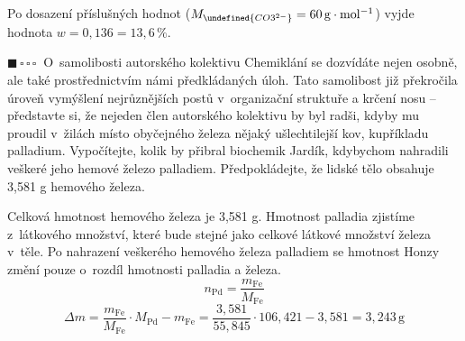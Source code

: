 \documentclass{book}
\let\ch\undefined
\newcommand{\jeden}{$\blacksquare \, \square \, \square \, \square \; \; $}
\renewenvironment{quotation}{\par}{\par} %
\begin{document}
Po dosazení příslušných hodnot ($M_{\ch{CO3^{2-}}}=60\,\mathrm{g\cdot mol^{-1}}$)
vyjde hodnota $w=0,136=13,6\,\%$.

\newpage %
\begin{quotation}
\jeden O~samolibosti autorského kolektivu Chemiklání se dozvídáte nejen osobně,
ale také prostřednictvím námi předkládaných úloh. Tato samolibost
již překročila úroveň vymýšlení nejrůznějších postů v~organizační
struktuře a krčení nosu -- představte si, že nejeden člen autorského
kolektivu by byl radši, kdyby mu proudil v~žilách místo obyčejného
železa nějaký ušlechtilejší kov, kupříkladu palladium. Vypočítejte,
kolik by přibral biochemik Jardík, kdybychom nahradili
veškeré jeho hemové železo palladiem. Předpokládejte, že lidské tělo
obsahuje 3,581 g hemového železa.
\end{quotation} \dotfill \par 
Celková hmotnost hemového železa je 3,581 g. Hmotnost palladia zjistíme z~látkového množství, které bude stejné jako celkové látkové množství železa v~těle. Po nahrazení veškerého
hemového železa palladiem se hmotnost Honzy změní pouze o~rozdíl hmotnosti
palladia a železa.
\[
n_{\mathrm{Pd}}=\frac{m_{\mathrm{Fe}}}{M_{\mathrm{Fe}}}
\]
\[
\Delta m=\frac{m_{\mathrm{Fe}}}{M_{\mathrm{Fe}}}\cdot M_{\mathrm{Pd}}-m_{\mathrm{Fe}}=\frac{3,581}{55,845}\cdot106,421-3,581=3,243\,\mathrm{g}
\]
\end{document}
